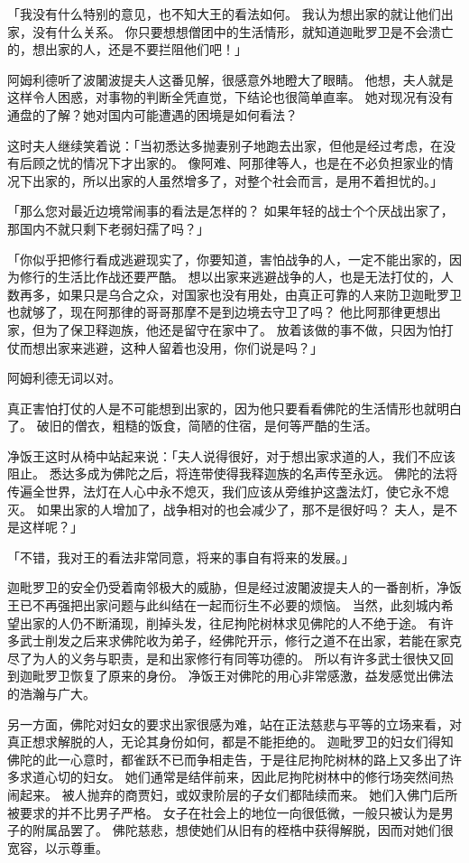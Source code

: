 \documentclass[twoside,openany]{book}
\begin{document}
「我没有什么特别的意见，也不知大王的看法如何。
我认为想出家的就让他们出家，没有什么关系。
你只要想想僧团中的生活情形，就知道迦毗罗卫是不会溃亡的，想出家的人，还是不要拦阻他们吧！」

阿姆利德听了波闍波提夫人这番见解，很感意外地瞪大了眼睛。
他想，夫人就是这样令人困惑，对事物的判断全凭直觉，下结论也很简单直率。
她对现况有没有通盘的了解？她对国内可能遭遇的困境是如何看法？

这时夫人继续笑着说：「当初悉达多抛妻别子地跑去出家，但他是经过考虑，在没有后顾之忧的情况下才出家的。
像阿难、阿那律等人，也是在不必负担家业的情况下出家的，所以出家的人虽然增多了，对整个社会而言，是用不着担忧的。」

「那么您对最近边境常闹事的看法是怎样的？
如果年轻的战士个个厌战出家了，那国内不就只剩下老弱妇孺了吗？」

「你似乎把修行看成逃避现实了，你要知道，害怕战争的人，一定不能出家的，因为修行的生活比作战还要严酷。
想以出家来逃避战争的人，也是无法打仗的，人数再多，如果只是乌合之众，对国家也没有用处，由真正可靠的人来防卫迦毗罗卫也就够了，现在阿那律的哥哥那摩不是到边境去守卫了吗？
他比阿那律更想出家，但为了保卫释迦族，他还是留守在家中了。
放着该做的事不做，只因为怕打仗而想出家来逃避，这种人留着也没用，你们说是吗？」

阿姆利德无词以对。

真正害怕打仗的人是不可能想到出家的，因为他只要看看佛陀的生活情形也就明白了。
破旧的僧衣，粗糙的饭食，简陋的住宿，是何等严酷的生活。

净饭王这时从椅中站起来说：「夫人说得很好，对于想出家求道的人，我们不应该阻止。
悉达多成为佛陀之后，将连带使得我释迦族的名声传至永远。
佛陀的法将传遍全世界，法灯在人心中永不熄灭，我们应该从旁维护这盏法灯，使它永不熄灭。
如果出家的人增加了，战争相对的也会减少了，那不是很好吗？
夫人，是不是这样呢？」

「不错，我对王的看法非常同意，将来的事自有将来的发展。」

迦毗罗卫的安全仍受着南邻极大的威胁，但是经过波闍波提夫人的一番剖析，净饭王已不再强把出家问题与此纠结在一起而衍生不必要的烦恼。
当然，此刻城内希望出家的人仍不断涌现，削掉头发，往尼拘陀树林求见佛陀的人不绝于途。
有许多武士削发之后来求佛陀收为弟子，经佛陀开示，修行之道不在出家，若能在家克尽了为人的义务与职责，是和出家修行有同等功德的。
所以有许多武士很快又回到迦毗罗卫恢复了原来的身份。
净饭王对佛陀的用心非常感激，益发感觉出佛法的浩瀚与广大。

另一方面，佛陀对妇女的要求出家很感为难，站在正法慈悲与平等的立场来看，对真正想求解脱的人，无论其身份如何，都是不能拒绝的。
迦毗罗卫的妇女们得知佛陀的此一心意时，都雀跃不已而争相走告，于是往尼拘陀树林的路上又多出了许多求道心切的妇女。
她们通常是结伴前来，因此尼拘陀树林中的修行场突然间热闹起来。
被人抛弃的商贾妇，或奴隶阶层的子女们都陆续而来。
她们入佛门后所被要求的并不比男子严格。
女子在社会上的地位一向很低微，一般只被认为是男子的附属品罢了。
佛陀慈悲，想使她们从旧有的桎梏中获得解脱，因而对她们很宽容，以示尊重。
\end{document}
